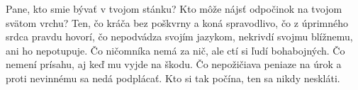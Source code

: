 Pane, kto smie bývať v tvojom stánku?
Kto môže nájsť odpočinok na tvojom svätom vrchu?
\versseparator
Ten, čo kráča bez poškvrny a koná spravodlivo,
\versseparator
čo z úprimného srdca pravdu hovorí,
čo nepodvádza svojím jazykom,
\versseparator
nekrivdí svojmu blížnemu,
ani ho nepotupuje.
\versseparator
Čo ničomníka nemá za nič,
ale ctí si ľudí bohabojných.
\versseparator
Čo nemení prísahu, aj keď mu vyjde na škodu.
Čo nepožičiava peniaze na úrok
a proti nevinnému sa nedá podplácať.
\versseparator
Kto si tak počína, ten sa nikdy neskláti. 
